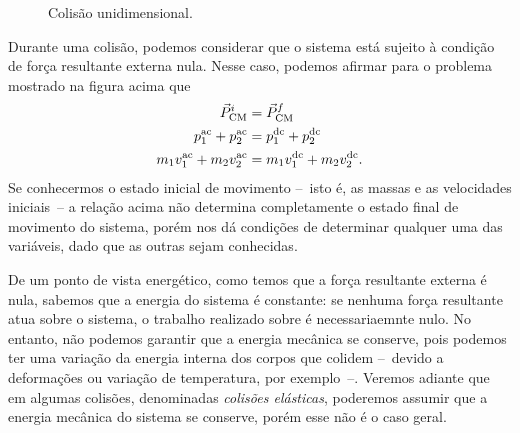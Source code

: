 \begin{figure}[!h]
\centering
{}
\caption{Colisão unidimensional. \label{Fig:ColisaoUnidimensional}}
\end{figure}

Durante uma colisão, podemos considerar que o sistema está sujeito à condição de força resultante externa nula. Nesse caso, podemos afirmar para o problema mostrado na figura acima que
\begin{align}
    \vec{P}_{\rm{CM}}^i &= \vec{P}_{\rm{CM}}^f \\
    p_{1}^{\rm{ac}} + p_2^{\rm{ac}} &= p_{1}^{\rm{dc}} + p_{2}^{\rm{dc}} \\
    m_1 v_1^{\rm{ac}} + m_2 v_2^{\rm{ac}} &= m_1 v_1^{\rm{dc}} + m_2 v_2^{\rm{dc}}. \label{Eq:ConservacaoMomentoUnidimensional}
\end{align}
%
Se conhecermos o estado inicial de movimento --~isto é, as massas e as velocidades iniciais~-- a relação acima não determina completamente o estado final de movimento do sistema, porém nos dá condições de determinar qualquer uma das variáveis, dado que as outras sejam conhecidas.

De um ponto de vista energético, como temos que a força resultante externa é nula, sabemos que a energia do sistema é constante: se nenhuma força resultante atua sobre o sistema, o trabalho realizado sobre é necessariaemnte nulo. No entanto, não podemos garantir que a energia mecânica se conserve, pois podemos ter uma variação da energia interna dos corpos que colidem --~devido a deformações ou variação de temperatura, por exemplo~--. Veremos adiante que em algumas colisões, denominadas \emph{colisões elásticas}, poderemos assumir que a energia mecânica do sistema se conserve, porém esse não é o caso geral.

